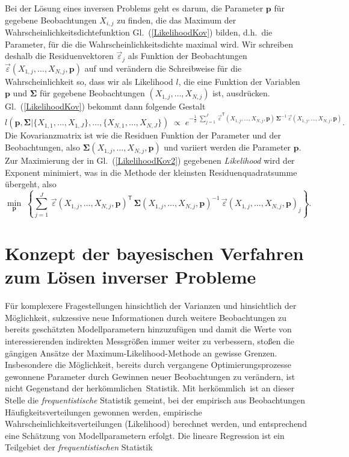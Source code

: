 Bei der Lösung eines inversen Problems geht es darum, die Parameter $\mathbf{p}$
für gegebene Beobachtungen $X_{i,j}$ zu finden, die das Maximum der Wahrscheinlichkeitsdichtefunktion
Gl.~(\ref{LikelihoodKov}) bilden, d.h.\ die Parameter, für die die Wahrscheinlichkeitsdichte
maximal wird. Wir schreiben deshalb die Residuenvektoren $\vec \varepsilon_j$ als Funktion
der Beobachtungen $\vec \varepsilon(X_{1,j},\dots,X_{N,j},\mathbf{p})$ auf und verändern die Schreibweise
für die Wahrscheinlichkeit so, dass wir als Likelihood $l$, die eine Funktion der
Variablen $\mathbf{p}$ und $\boldsymbol{\Sigma}$ für gegebene Beobachtungen $(X_{1,j},\dots,X_{N,j})$ ist,
ausdrücken. Gl.~(\ref{LikelihoodKov}) bekommt dann folgende Gestalt
\begin{equation}
l(\mathbf{p}, \boldsymbol{\Sigma} | \{X_{1,1}, \dots, X_{1,J}\}, \dots, \{X_{N,1}, \dots, X_{N,J}\} ) \; \propto \;
e^{-\frac{1}{2} \; \sum\limits_{j=1}^J \, \vec \varepsilon^\mathsf{T}(X_{1,j},\dots,X_{N,j},\mathbf{p}) \,
 \boldsymbol{\Sigma}^{-1} \, \vec \varepsilon(X_{1,j},\dots,X_{N,j},\mathbf{p}) } .
\label{LikelihoodKov2}
\end{equation}
Die Kovarianzmatrix ist wie die Residuen Funktion der Parameter und der Beobachtungen,
also $\boldsymbol{\Sigma}(X_{1,j},\dots,X_{N,j},\mathbf{p})$ und
variiert werden die Parameter $\mathbf{p}$.
Zur Maximierung der in Gl.~(\ref{LikelihoodKov2}) gegebenen
\textsl{Likelihood} wird der Exponent minimiert, was in die Methode der kleinsten Residuenquadratsumme
übergeht, also
\begin{equation}
\min_{\mathbf{p}} \; \left\{
 \sum\limits_{j=1}^J \, \vec \varepsilon(X_{1,j},\dots,X_{N,j},\mathbf{p})^\mathsf{T} \,
\boldsymbol{\Sigma}(X_{1,j},\dots,X_{N,j},\mathbf{p})^{-1} \, \vec \varepsilon(X_{1,j},\dots,X_{N,j},\mathbf{p})_j \right\} .
\end{equation}

\section{Konzept der bayesischen Verfahren zum Lösen inverser Probleme}
\label{bayeskonzept}

Für komplexere Fragestellungen hinsichtlich der Varianzen und hinsichtlich der Möglichkeit,
sukzessive neue Informationen durch weitere Beobachtungen zu bereits geschätzten Modellparametern
hinzuzufügen und damit die Werte von
interessierenden indirekten Messgrößen immer weiter zu verbessern, stoßen die gängigen Ansätze
der Maximum-Likelihood-Methode an gewisse Grenzen. Insbesondere die Möglichkeit, bereits durch
vergangene Optimierungsprozesse gewonnene Parameter durch Gewinnen neuer Beobachtungen zu verändern,
ist nicht Gegenstand der \glqq herkömmlichen\grqq ~Statistik. Mit \glqq herkömmlich\grqq ~ist
an dieser Stelle die \textsl{frequentistische} Statistik gemeint, bei der empirisch aus
Beobachtungen Häufigkeitsverteilungen gewonnen werden, empirische Wahrscheinlichkeitsverteilungen
(Likelihood) berechnet werden, und entsprechend eine Schätzung von Modellparametern erfolgt.
Die lineare Regression ist ein Teilgebiet der \textsl{frequentistischen} Statistik

